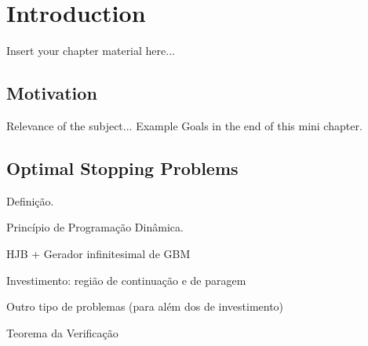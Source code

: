
\chapter{Introduction}
\label{chapter:introduction}

Insert your chapter material here...

\section{Motivation}
\label{section:motivation}

Relevance of the subject...
Example
Goals in the end of this mini chapter.

\section{Optimal Stopping Problems}
\label{section:osp}

Definição.

Princípio de Programação Dinâmica.

HJB + Gerador infinitesimal de GBM

Investimento: região de continuação e de paragem

Outro tipo de problemas (para além dos de investimento)

Teorema da Verificação



